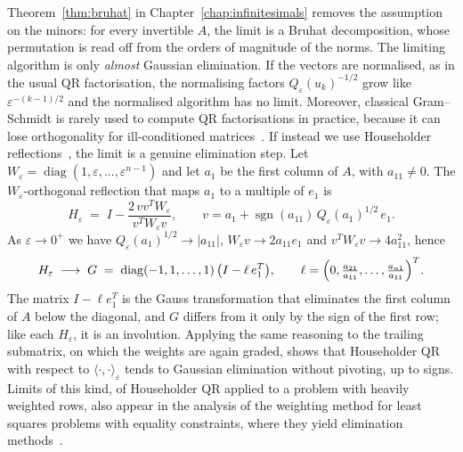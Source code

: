 \documentclass[12pt, a4paper]{report}
\theoremstyle{plain}
\theoremstyle{definition}
\theoremstyle{remark}
\theoremstyle{plain}
\newcommand{\sign}{\operatorname{sgn}}
\DeclareMathOperator{\diag}{diag}
\begin{document}
Theorem~\ref{thm:bruhat} in Chapter~\ref{chap:infinitesimals} removes the assumption on the minors: for every invertible $A$, the limit is a Bruhat decomposition, whose permutation is read off from the orders of magnitude of the norms. The limiting algorithm is only \emph{almost} Gaussian elimination. If the vectors are normalised, as in the usual QR factorisation, the normalising factors $Q_\varepsilon(u_k)^{-1/2}$ grow like $\varepsilon^{-(k-1)/2}$ and the normalised algorithm has no limit. Moreover, classical Gram--Schmidt is rarely used to compute QR factorisations in practice, because it can lose orthogonality for ill-conditioned matrices~\cite{Higham2002,GolubVanLoan2013}. If instead we use Householder reflections~\cite{GolubVanLoan2013}, the limit is a genuine elimination step. Let $W_\varepsilon=\diag(1,\varepsilon,\dots,\varepsilon^{n-1})$ and let $a_1$ be the first column of $A$, with $a_{11}\neq 0$. The $W_\varepsilon$-orthogonal reflection that maps $a_1$ to a multiple of $e_1$ is
\[
H_\varepsilon \;=\; I-\frac{2\,v v^{T}W_\varepsilon}{v^{T}W_\varepsilon v},\qquad v=a_1+\sign(a_{11})\,Q_\varepsilon(a_1)^{1/2}\,e_1 .
\]
As $\varepsilon\to 0^+$ we have $Q_\varepsilon(a_1)^{1/2}\to|a_{11}|$, $W_\varepsilon v\to 2a_{11}e_1$ and $v^TW_\varepsilon v\to 4a_{11}^2$, hence
\begin{equation}\label{eq:householder-limit}
H_\varepsilon \;\longrightarrow\; G \;=\; \diag(-1,1,\dots,1)\,\bigl(I-\ell\, e_1^{T}\bigr),
\qquad \ell=\Bigl(0,\tfrac{a_{21}}{a_{11}},\dots,\tfrac{a_{n1}}{a_{11}}\Bigr)^{T}.
\end{equation}
The matrix $I-\ell e_1^T$ is the Gauss transformation that eliminates the first column of $A$ below the diagonal, and $G$ differs from it only by the sign of the first row; like each $H_\varepsilon$, it is an involution. Applying the same reasoning to the trailing submatrix, on which the weights are again graded, shows that Householder QR with respect to $\langle\cdot,\cdot\rangle_\varepsilon$ tends to Gaussian elimination without pivoting, up to signs. Limits of this kind, of Householder QR applied to a problem with heavily weighted rows, also appear in the analysis of the weighting method for least squares problems with equality constraints, where they yield elimination methods~\cite{CoxHigham1999}.
\end{document}
